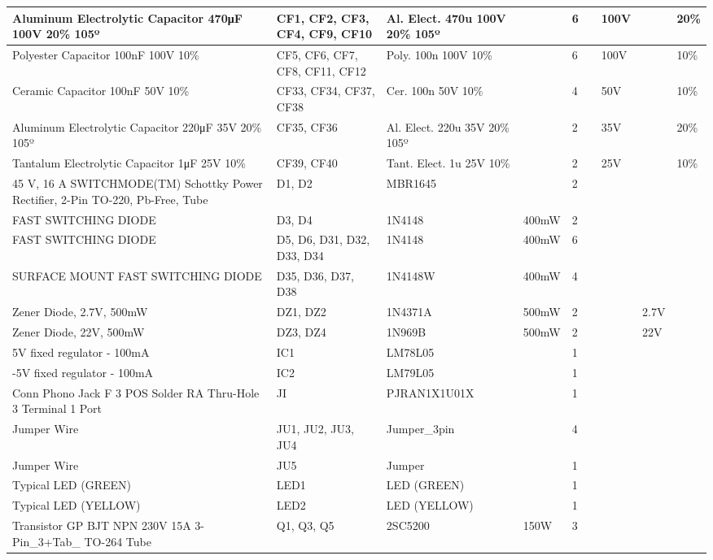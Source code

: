 \begin{table}[h!]
{\begin{tabular}{|l|l|l|l|l|l|l|l|l|}
	Aluminum Electrolytic Capacitor 470μF 100V 20\% 105º & CF1, CF2, CF3, CF4, CF9, CF10 & Al. Elect. 470u 100V 20\% 105º &  & 6 &  & 100V &  & 20\% \\ \hline
	Polyester Capacitor 100nF 100V 10\% & CF5, CF6, CF7, CF8, CF11, CF12 & Poly. 100n 100V 10\% &  & 6 &  & 100V &  & 10\% \\ \hline
	Ceramic Capacitor 100nF 50V 10\% & CF33, CF34, CF37, CF38 & Cer. 100n 50V 10\% &  & 4 &  & 50V &  & 10\% \\ \hline
	Aluminum Electrolytic Capacitor 220μF 35V 20\% 105º & CF35, CF36 & Al. Elect. 220u 35V 20\% 105º &  & 2 &  & 35V &  & 20\% \\ \hline
	Tantalum Electrolytic Capacitor 1μF 25V 10\% & CF39, CF40 & Tant. Elect. 1u 25V 10\% &  & 2 &  & 25V &  & 10\% \\ \hline
	45 V, 16 A SWITCHMODE(TM) Schottky Power Rectifier, 2-Pin TO-220, Pb-Free, Tube & D1, D2 & MBR1645 &  & 2 &  &  &  &  \\ \hline
	FAST SWITCHING DIODE & D3, D4 & 1N4148 & 400mW & 2 &  &  &  &  \\ \hline
	FAST SWITCHING DIODE & D5, D6, D31, D32, D33, D34 & 1N4148 & 400mW & 6 &  &  &  &  \\ \hline
	SURFACE MOUNT FAST SWITCHING DIODE & D35, D36, D37, D38 & 1N4148W & 400mW & 4 &  &  &  &  \\ \hline
	Zener Diode, 2.7V, 500mW & DZ1, DZ2 & 1N4371A & 500mW & 2 &  &  & 2.7V &  \\ \hline
	Zener Diode, 22V, 500mW & DZ3, DZ4 & 1N969B & 500mW & 2 &  &  & 22V &  \\ \hline
	5V fixed regulator - 100mA & IC1 & LM78L05 &  & 1 &  &  &  &  \\ \hline
	-5V fixed regulator - 100mA & IC2 & LM79L05 &  & 1 &  &  &  &  \\ \hline
	Conn Phono Jack F 3 POS Solder RA Thru-Hole 3 Terminal 1 Port & JI & PJRAN1X1U01X &  & 1 &  &  &  &  \\ \hline
	Jumper Wire & JU1, JU2, JU3, JU4 & Jumper\_3pin &  & 4 &  &  &  &  \\ \hline
	Jumper Wire & JU5 & Jumper &  & 1 &  &  &  &  \\ \hline
	Typical LED (GREEN) & LED1 & LED (GREEN) &  & 1 &  &  &  &  \\ \hline
	Typical LED (YELLOW) & LED2 & LED (YELLOW) &  & 1 &  &  &  &  \\ \hline
	Transistor GP BJT NPN 230V 15A 3-Pin\_3+Tab\_ TO-264 Tube & Q1, Q3, Q5 & 2SC5200 & 150W & 3 &  &  &  &  \\ \hline

\end{tabular}}
\end{table}
